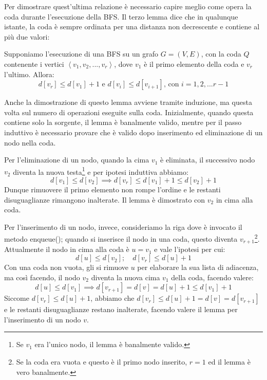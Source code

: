\noindent Per dimostrare quest'ultima relazione è necessario capire meglio come opera la coda durante l'esecuzione della BFS. Il terzo lemma dice che in qualunque istante, la coda è sempre ordinata per una distanza non decrescente e contiene al più due valori: \begin{lemma}
	Supponiamo l'esecuzione di una BFS su un grafo $G=(V,E)$, con la coda $Q$ contenente i vertici $\left<v_1, v_2, ..., v_r \right>$, dove $v_1$ è il primo elemento della coda e $v_r$ l'ultimo. Allora: \[d[v_r]\leq d[v_1]+1 \text{ e } d[v_i]\leq d[v_{i+1}] \text{, con } i=1,2,...r-1\] 
\end{lemma}
\noindent Anche la dimostrazione di questo lemma avviene tramite induzione, ma questa volta sul numero di operazioni eseguite sulla coda. Inizialmente, quando questa contiene solo la sorgente, il lemma è banalmente valido, mentre per il passo induttivo è necessario provare che è valido dopo inserimento ed eliminazione di un nodo nella coda.\par
Per l'eliminazione di un nodo, quando la cima $v_1$ è eliminata, il successivo nodo $v_2$ diventa la nuova testa\footnote{Se $v_1$ era l'unico nodo, il lemma è banalmente valido.} e per ipotesi induttiva abbiamo: \[d[v_1] \leq d[v_2] \implies d[v_r]\leq d[v_1]+1\leq d[v_2]+1\]
\noindent Dunque rimuovere il primo elemento non rompe l'ordine e le restanti disuguaglianze rimangono inalterate. Il lemma è dimostrato con $v_2$ in cima alla coda.\par
Per l'inserimento di un nodo, invece, consideriamo la riga dove è invocato il metodo enqueue(); quando si inserisce il nodo in una coda, questo diventa $v_{r+1}$\footnote{Se la coda era vuota e questo è il primo nodo inserito, $r=1$ ed il lemma è vero banalmente.}. Attualmente il nodo in cima alla coda è $u = v_1$ e vale l'ipotesi per cui: \[d[u] \leq d[v_2];\quad d[v_r] \leq d[u]+1\]
\noindent Con una coda non vuota, gli si rimuove $u$ per elaborare la sua lista di adiacenza, ma così facendo, il nodo $v_2$ diventa la nuova cima $v_1$ della coda, facendo valere: \[d[u]\leq d[v_1] \implies d[v_{r+1}] = d[v] = d[u]+1\leq d[v_1]+1\]
\noindent Siccome $d[v_r]\leq d[u]+1$, abbiamo che $d[v_r]\leq d[u]+1 = d[v] = d[v_{r+1}]$ e le restanti disuguaglianze restano inalterate, facendo valere il lemma per l'inserimento di un nodo $v$.\newline

